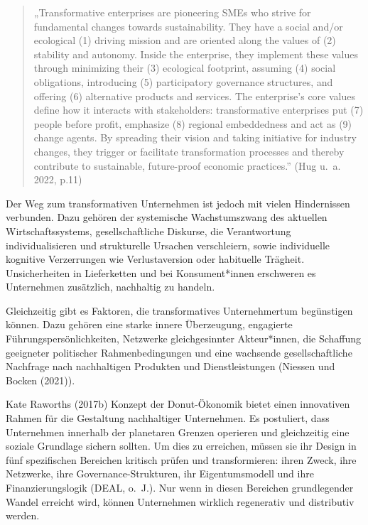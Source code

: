 \documentclass[
  nswissgerman,
  a4paper,
  openany]{book}
\begin{document}
\begin{quote}
„Transformative enterprises are pioneering SMEs who strive for
fundamental changes towards sustainability. They have a social and/or
ecological (1) driving mission and are oriented along the values of (2)
stability and autonomy. Inside the enterprise, they implement these
values through minimizing their (3) ecological footprint, assuming (4)
social obligations, introducing (5) participatory governance structures,
and offering (6) alternative products and services. The enterprise's
core values define how it interacts with stakeholders: transformative
enterprises put (7) people before profit, emphasize (8) regional
embeddedness and act as (9) change agents. By spreading their vision and
taking initiative for industry changes, they trigger or facilitate
transformation processes and thereby contribute to sustainable,
future-proof economic practices.'' (Hug u.~a. 2022, p.11)
\end{quote}

Der Weg zum transformativen Unternehmen ist jedoch mit vielen
Hindernissen verbunden. Dazu gehören der systemische Wachstumszwang des
aktuellen Wirtschaftssystems, gesellschaftliche Diskurse, die
Verantwortung individualisieren und strukturelle Ursachen verschleiern,
sowie individuelle kognitive Verzerrungen wie Verlustaversion oder
habituelle Trägheit. Unsicherheiten in Lieferketten und bei
Konsument*innen erschweren es Unternehmen zusätzlich, nachhaltig zu
handeln.

Gleichzeitig gibt es Faktoren, die transformatives Unternehmertum
begünstigen können. Dazu gehören eine starke innere Überzeugung,
engagierte Führungspersönlichkeiten, Netzwerke gleichgesinnter
Akteur*innen, die Schaffung geeigneter politischer Rahmenbedingungen und
eine wachsende gesellschaftliche Nachfrage nach nachhaltigen Produkten
und Dienstleistungen (Niessen und Bocken (2021)).

Kate Raworths (2017b) Konzept der Donut-Ökonomik bietet einen
innovativen Rahmen für die Gestaltung nachhaltiger Unternehmen. Es
postuliert, dass Unternehmen innerhalb der planetaren Grenzen operieren
und gleichzeitig eine soziale Grundlage sichern sollten. Um dies zu
erreichen, müssen sie ihr Design in fünf spezifischen Bereichen kritisch
prüfen und transformieren: ihren Zweck, ihre Netzwerke, ihre
Governance-Strukturen, ihr Eigentumsmodell und ihre Finanzierungslogik
(DEAL, o.~J.). Nur wenn in diesen Bereichen grundlegender Wandel
erreicht wird, können Unternehmen wirklich regenerativ und distributiv
werden.
\end{document}
